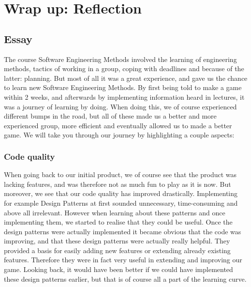 \chapter{Wrap up: Reflection}

\section{Essay}
The course Software Engineering Methods involved the learning of engineering methods, tactics of working in a group, coping with deadlines and because of the latter: planning. But most of all it was a great experience, and gave us the chance to learn new Software Engineering Methods. By first being told to make a game within 2 weeks, and afterwards by implementing information heard in lectures, it was a journey of learning by doing. When doing this, we of course experienced different bumps in the road, but all of these made us a better and more experienced group, more efficient and eventually allowed us to made a better game. We will take you through our journey by highlighting a couple aspects:

\subsection{Code quality}
When going back to our initial product, we of course see that the product was lacking features, and was therefore not as much fun to play as it is now. But moreover, we see that our code quality has improved drastically. Implementing for example Design Patterns at first sounded unnecessary, time-consuming and above all irrelevant. However when learning about these patterns and once implementing them, we started to realise that they could be useful. Once the design patterns were actually implemented it became obvious that the code was improving, and that these design patterns were actually really helpful. They provided a basis for easily adding new features or extending already existing features. Therefore they were in fact very useful in extending and improving our game. Looking back, it would have been better if we could have implemented these design patterns earlier, but that is of course all a part of the learning curve. 

